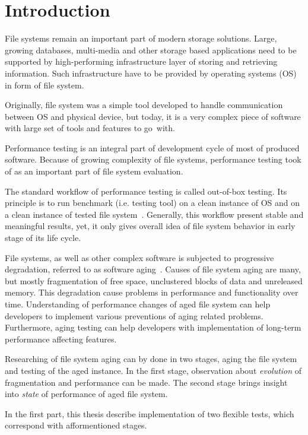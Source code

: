 \documentclass[
  color, %
  table, %
  lof,   %
  lot,   %
]{fithesis3}
\begin{document}
\chapter{Introduction}
File systems remain an important part of modern storage solutions. Large, growing databases, multi-media and other storage based applications need to be supported by high-performing infrastructure layer of storing and retrieving information. Such infrastructure have to be provided by operating systems (OS) in form of file system.

Originally, file system was a simple tool developed to handle communication between OS and physical device, but today, it is a very complex piece of software with large set of tools and features to go~with.

Performance testing is an integral part of development cycle of most of produced software. Because of growing complexity of file systems, performance testing took of as an important part of file system evaluation.

The standard workflow of performance testing is called out-of-box testing. Its principle is to run benchmark (i.e. testing tool) on a clean instance of OS and on a clean instance of tested file system~\cite{Traeger:2008:NYS:1367829.1367831}. Generally, this workflow present stable and meaningful results, yet, it only gives overall idea of file system behavior in early stage of its life cycle. 

File systems, as well as other complex software is subjected to progressive degradation, referred to as software aging~\cite{Cotroneo:2014:SSA:2543749.2539117}. Causes of file system aging are many, but mostly fragmentation of free space, unclustered blocks of data and unreleased memory. This degradation cause problems in performance and functionality over time. Understanding of performance changes of aged file system can help developers to implement various preventions of aging related problems. Furthermore, aging testing can help developers with implementation of long-term performance affecting features.

Researching of file system aging can by done in two stages, aging the file system and testing of the aged instance. In the first stage, observation about \emph{evolution} of fragmentation and performance can be made. The second stage brings insight into \emph{state} of performance of aged file system.

In the first part, this thesis describe implementation of two flexible tests, which correspond with afformentioned stages.
 
\end{document}
